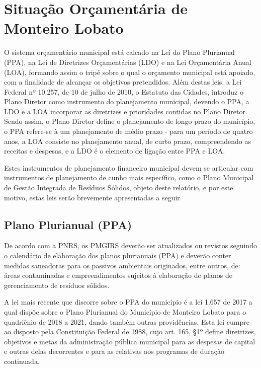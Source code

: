	\section{Situação Orçamentária de Monteiro Lobato}
	
	O sistema orçamentário municipal está calcado na Lei do Plano Plurianual (PPA), na Lei de Diretrizes Orçamentárias (LDO) e na Lei Orçamentária Anual (LOA), formando assim o tripé sobre o qual o orçamento municipal está apoiado, com a finalidade de alcançar os objetivos pretendidos. Além destas leis, a Lei Federal nº 10.257, de 10 de julho de 2010, o Estatuto das Cidades, introduz o Plano Diretor como instrumento do planejamento municipal, devendo o PPA, a LDO e a LOA incorporar as diretrizes e prioridades contidas no Plano Diretor. Sendo assim, o Plano Diretor define o planejamento de longo prazo do município, o PPA refere-se à um planejamento de médio prazo - para um período de quatro anos, a LOA consiste no planejamento anual, de curto prazo, compreendendo as receitas e despesas, e a LDO é o elemento de ligação entre PPA e LOA.
	
	Estes instrumentos de planejamento financeiro municipal devem se articular com instrumentos de planejamento de cunho mais específico, como o Plano Municipal de Gestão Integrada de Resíduos Sólidos, objeto deste relatório, e por este motivo, estas leis serão brevemente apresentadas a seguir. 
	
	\subsection{Plano Plurianual (PPA)}
	
	De acordo com a PNRS, os PMGIRS deverão ser atualizados ou revistos seguindo o calendário de elaboração dos planos plurianuais (PPA) e deverão conter medidas saneadoras para os passivos ambientais originados, entre outros, de: áreas contaminadas e empreendimentos sujeitos à elaboração de planos de gerenciamento de resíduos sólidos.
	
	A lei mais recente que discorre sobre o PPA do município é a lei 1.657 de 2017 a qual dispõe sobre o Plano Plurianual do Município de Monteiro Lobato para o quadriênio de 2018 a 2021, dando também outras providências. Esta lei cumpre ao disposto pela Constituição Federal de 1988, cujo art. 165, §1º define diretrizes, objetivos e metas da administração pública municipal para as despesas de capital e outras delas decorrentes e para as relativas aos programas de duração continuada. 
	
